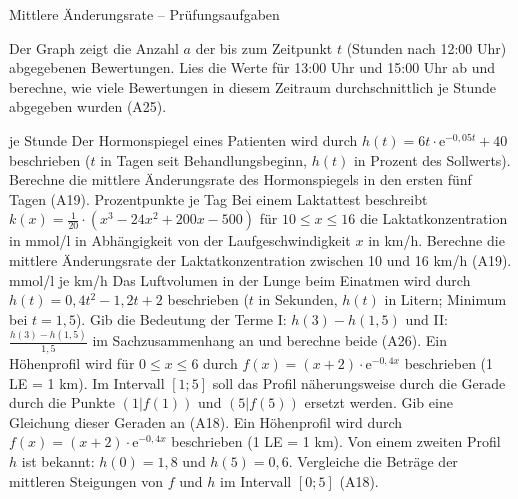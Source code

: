 \begin{aufgabe}{Mittlere Änderungsrate – Prüfungsaufgaben}
\begin{teile}
\teil Der Graph zeigt die Anzahl $a$ der bis zum Zeitpunkt $t$ (Stunden nach 12:00 Uhr) abgegebenen Bewertungen. Lies die Werte für 13:00 Uhr und 15:00 Uhr ab und berechne, wie viele Bewertungen in diesem Zeitraum durchschnittlich je Stunde abgegeben wurden \hfill (A25).

\begin{ksys}[xmin=0,xmax=4,ymin=0,ymax=1800,xstep=1,ystep=200,xlabel=t in h,ylabel=a,ablesen]\end{ksys}
\leerfeld je Stunde
\teil Der Hormonspiegel eines Patienten wird durch $h(t) = 6t \cdot \mathrm{e}^{-0{,}05t} + 40$ beschrieben ($t$ in Tagen seit Behandlungsbeginn, $h(t)$ in Prozent des Sollwerts). Berechne die mittlere Änderungsrate des Hormonspiegels in den ersten fünf Tagen \hfill (A19). \leerfeld Prozentpunkte je Tag
\teil Bei einem Laktattest beschreibt $k(x) = \frac{1}{20} \cdot (x^3 - 24x^2 + 200x - 500)$ für $10 \le x \le 16$ die Laktatkonzentration in mmol/l in Abhängigkeit von der Laufgeschwindigkeit $x$ in km/h. Berechne die mittlere Änderungsrate der Laktatkonzentration zwischen 10 und 16 km/h \hfill (A19). \leerfeld mmol/l je km/h
\teil Das Luftvolumen in der Lunge beim Einatmen wird durch $h(t) = 0{,}4t^2 - 1{,}2t + 2$ beschrieben ($t$ in Sekunden, $h(t)$ in Litern; Minimum bei $t = 1{,}5$). Gib die Bedeutung der Terme I: $h(3) - h(1{,}5)$ und II: $\frac{h(3) - h(1{,}5)}{1{,}5}$ im Sachzusammenhang an und berechne beide \hfill (A26).
\teil Ein Höhenprofil wird für $0 \le x \le 6$ durch $f(x) = (x + 2) \cdot \mathrm{e}^{-0{,}4x}$ beschrieben (1 LE = 1 km). Im Intervall $[1; 5]$ soll das Profil näherungsweise durch die Gerade durch die Punkte $(1 | f(1))$ und $(5 | f(5))$ ersetzt werden. Gib eine Gleichung dieser Geraden an \hfill (A18).
\teil Ein Höhenprofil wird durch $f(x) = (x + 2) \cdot \mathrm{e}^{-0{,}4x}$ beschrieben (1 LE = 1 km). Von einem zweiten Profil $h$ ist bekannt: $h(0) = 1{,}8$ und $h(5) = 0{,}6$. Vergleiche die Beträge der mittleren Steigungen von $f$ und $h$ im Intervall $[0; 5]$ \hfill (A18).
\end{teile}
\end{aufgabe}

